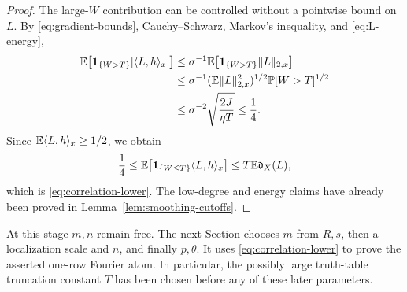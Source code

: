 \begin{proof}
The large-$W$ contribution can be controlled without a pointwise bound
on $L$. By \eqref{eq:gradient-bounds}, Cauchy--Schwarz, Markov's
inequality, and \eqref{eq:L-energy},
\begin{align*}
 \mathbb E\bigl[\mathbf1_{\{W>T\}}|\langle L,h\rangle_x|\bigr]
 &\le\sigma^{-1}\mathbb E\bigl[\mathbf1_{\{W>T\}}\lVert L\rVert_{2,x}\bigr]\\
 &\le\sigma^{-1}(\mathbb E\lVert L\rVert_{2,x}^2)^{1/2}
                 \mathbb P[W>T]^{1/2}\\
 &\le\sigma^{-2}\sqrt{\frac{2J}{\eta T}}\le\frac14.
\end{align*}
Since $\mathbb E\langle L,h\rangle_x\ge1/2$, we obtain
\[
 \frac14
 \le\mathbb E\bigl[\mathbf1_{\{W\le T\}}\langle L,h\rangle_x\bigr]
 \le T\mathbb E\mathfrak d_X(L),
\]
which is \eqref{eq:correlation-lower}. The low-degree and energy
claims have already been proved in Lemma~\ref{lem:smoothing-cutoffs}.
\end{proof}

At this stage $m,n$ remain free. The next Section chooses $m$ from
$R,s$, then a localization scale and $n$, and finally $p,\theta$.
It uses \eqref{eq:correlation-lower} to prove the asserted one-row
Fourier atom. In particular, the possibly large truth-table truncation
constant $T$ has been chosen before any of these later parameters.
